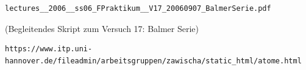 \documentclass[]{article}
\begin{document}
\newpage
\begin{thebibliography}{}

 \begin{verbatim}
lectures__2006__ss06_FPraktikum__V17_20060907_BalmerSerie.pdf
\end{verbatim} (Begleitendes Skript zum Versuch 17: Balmer Serie)

 \begin{verbatim}
https://www.itp.uni-hannover.de/fileadmin/arbeitsgruppen/zawischa/static_html/atome.html
\end{verbatim} 

\end{thebibliography}
\end{document}
